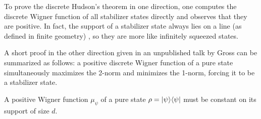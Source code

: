 To prove the discrete Hudson's theorem in one direction, one computes the discrete Wigner function of all stabilizer states directly and observes that they are positive. In fact, the support of a stabilizer state always lies on a line (as defined in finite geometry) \cite{gross_hudsons_2006}, so they are more like infinitely squeezed states.

A short proof in the other direction given in an unpublished talk by Gross \cite{gross2015coogee} can be summarized as follows: a positive discrete Wigner function of
a pure state simultaneously maximizes the 2-norm and minimizes the 1-norm, forcing it to be a stabilizer state.
\begin{lemma}
	\label{lem:supp_size}A positive Wigner function $\mu_{\psi}$ of
	a pure state $\rho= {\left\vert{\psi}\right\rangle}{\left\langle{\psi}\right\vert}$ must be constant on
	its support of size $d$.
\end{lemma}
